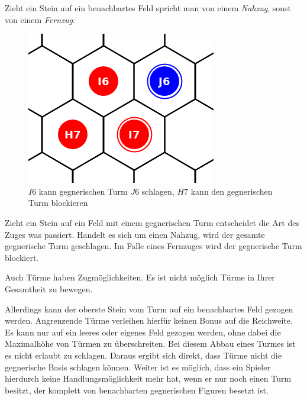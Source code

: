 Zieht ein Stein auf ein benachbartes Feld spricht man von einem \emph{Nahzug}, sonst von einem \emph{Fernzug}.

\newpage
\begin{figure}[ht]
\begin{center}
\includegraphics[scale=0.25]{graphic/token-kick-block-tower.png}
\end{center}
\caption*{$I6$ kann gegnerischen Turm $J6$ schlagen, $H7$ kann den gegnerischen Turm blockieren}
\end{figure}

Zieht ein Stein auf ein Feld mit einem gegnerischen Turm entscheidet die Art des Zuges was passiert. Handelt es sich um einen Nahzug, wird der gesamte gegnerische Turm geschlagen. Im Falle eines Fernzuges wird der gegnerische Turm blockiert.

Auch Türme haben Zugmöglichkeiten. Es ist nicht möglich Türme in Ihrer Gesamtheit zu bewegen. 

Allerdings kann der oberste Stein vom Turm auf ein benachbartes Feld gezogen werden. Angrenzende Türme verleihen hierfür keinen Bonus auf die Reichweite. Es kann nur auf ein leeres oder eigenes Feld gezogen werden, ohne dabei die Maximalhöhe von Türmen zu überschreiten.
\newpage 
Bei diesem Abbau eines Turmes ist es nicht erlaubt zu schlagen. Daraus ergibt sich direkt, dass Türme nicht die gegnerische Basis schlagen können. Weiter ist es möglich, dass ein Spieler hierdurch keine Handlungsmöglichkeit mehr hat, wenn er nur noch einen Turm besitzt, der komplett von benachbarten gegnerischen Figuren besetzt ist. 

